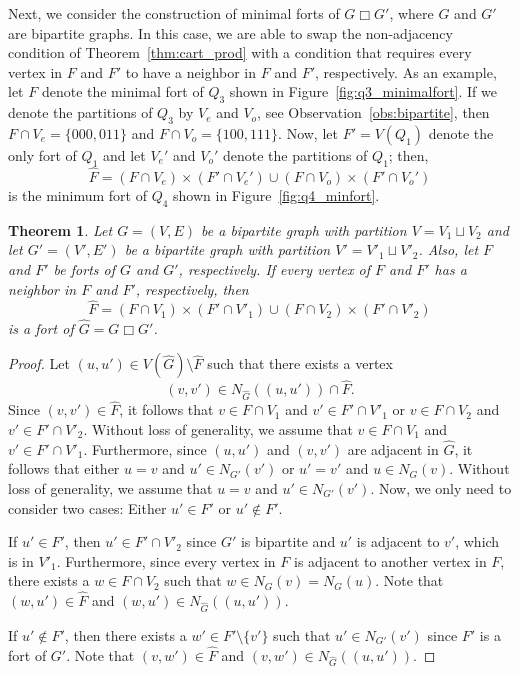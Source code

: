 \documentclass[twoside, 12pt]{article}
\newtheorem{theorem}{Theorem}[section]
\theoremstyle{definition}
\begin{document}
Next, we consider the construction of minimal forts of $G\Box G'$, where $G$ and $G'$ are bipartite graphs. 
In this case, we are able to swap the non-adjacency condition of Theorem~\ref{thm:cart_prod} with a condition that requires every vertex in $F$ and $F'$ to have a neighbor in $F$ and $F'$, respectively. 
As an example, let $F$ denote the minimal fort of $Q_{3}$ shown in Figure~\ref{fig:q3_minimalfort}.
If we denote the partitions of $Q_{3}$ by $V_{e}$ and $V_{o}$, see Observation~\ref{obs:bipartite}, then $F\cap V_{e}=\{000,011\}$ and $F\cap V_{o}=\{100,111\}$.
Now, let $F'=V(Q_{1})$ denote the only fort of $Q_{1}$ and let $V_{e}'$ and $V_{o}'$ denote the partitions of $Q_{1}$; then, 
\[
\hat{F} = \left(F\cap V_{e}\right)\times\left(F'\cap V_{e}'\right)\cup\left(F\cap V_{o}\right)\times\left(F'\cap V_{o}'\right)
\]
is the minimum fort of $Q_{4}$ shown in Figure~\ref{fig:q4_minfort}.
\begin{theorem}\label{thm:bip_cart_prod}
Let $G=(V,E)$ be a bipartite graph with partition $V=V_{1}\sqcup V_{2}$ and let $G'=(V',E')$ be a bipartite graph with partition $V'=V'_{1}\sqcup V'_{2}$.
Also, let $F$ and $F'$ be forts of $G$ and $G'$, respectively.
If every vertex of $F$ and $F'$ has a neighbor in $F$ and $F'$, respectively, then 
\[
\hat{F}=\left(F\cap V_{1}\right)\times\left(F'\cap V'_{1}\right)\cup\left(F\cap V_{2}\right)\times\left(F'\cap V'_{2}\right)
\]
is a fort of $\hat{G}=G\Box G'$. 
\end{theorem}
\begin{proof}
Let $(u,u')\in V(\hat{G})\setminus{\hat{F}}$ such that there exists a vertex
\[
(v,v')\in N_{\hat{G}}\left((u,u')\right)\cap\hat{F}.
\]
Since $(v,v')\in\hat{F}$, it follows that $v\in F\cap V_{1}$ and $v'\in F'\cap V'_{1}$ or $v\in F\cap V_{2}$ and $v'\in F'\cap V'_{2}$.
Without loss of generality, we assume that $v\in F\cap V_{1}$ and $v'\in F'\cap V'_{1}$.
Furthermore, since $(u,u')$ and $(v,v')$ are adjacent in $\hat{G}$, it follows that either $u=v$ and $u'\in N_{G'}(v')$ or $u'=v'$ and $u\in N_{G}(v)$.
Without loss of generality, we assume that $u=v$ and $u'\in N_{G'}(v')$.
Now, we only need to consider two cases: Either $u'\in F'$ or $u'\notin F'$.

If $u'\in F'$, then $u'\in F'\cap V'_{2}$ since $G'$ is bipartite and $u'$ is adjacent to $v'$, which is in $V'_{1}$.
Furthermore, since every vertex in $F$ is adjacent to another vertex in $F$, there exists a $w\in F\cap V_{2}$ such that $w\in N_{G}(v)=N_{G}(u)$.
Note that $(w,u')\in\hat{F}$ and $(w,u')\in N_{\hat{G}}\left((u,u')\right)$.

If $u'\notin F'$, then there exists a $w'\in F'\setminus\{v'\}$ such that $u'\in N_{G'}(v')$ since $F'$ is a fort of $G'$. 
Note that $(v,w')\in\hat{F}$ and $(v,w')\in N_{\hat{G}}\left((u,u')\right)$. 
\end{proof}
\end{document}
